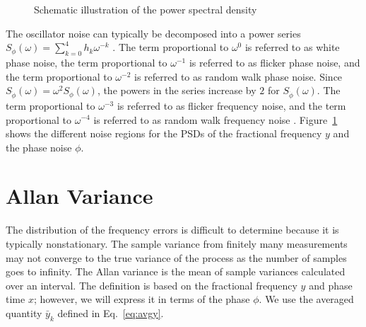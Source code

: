 \begin{figure}[htp]
	\centering
	\caption{Schematic illustration of the power spectral density} \label{fig:PSD}
\end{figure}
%
The oscillator noise can typically be decomposed into a power series $S_\phi(\omega) = \sum_{k=0}^{4} h_k\omega^{-k}$ \cite{Riley1994}. The term proportional to $\omega^0$ is referred to as white phase noise, the term proportional to $\omega^{-1}$ is referred to as flicker phase noise, and the term proportional to $\omega^{-2}$ is referred to as random walk phase noise. Since $S_{\dot{\phi}}(\omega) = \omega^2 S_\phi(\omega)$, the powers in the series increase by $2$ for $S_{\dot{\phi}}(\omega)$. The term proportional to $\omega^{-3}$ is referred to as flicker frequency noise, and the term proportional to $\omega^{-4}$ is referred to as random walk frequency noise \cite{Kartaschoff1978, LohWhite, LohFlicker, NISTFreqStandards}. Figure~\ref{fig:PSD} shows the different noise regions for the PSDs of the fractional frequency $y$ and the phase noise $\phi$.


\section{Allan Variance} \label{sec:avar}

The distribution of the frequency errors is difficult to determine because it is typically nonstationary.  The sample variance from finitely many measurements may not converge to the true variance of the process as the number of samples goes to infinity. The Allan variance is the mean of sample variances calculated over an interval. The definition is based on the fractional frequency $y$ and phase time $x$; however, we will express it in terms of the phase $\phi$. We use the averaged quantity $\bar{y}_k$ defined in Eq.~\ref{eq:avgy}.

